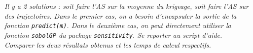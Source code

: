\documentclass[12pt]{scrartcl}
\begin{document}
\textit{Il y a 2 solutions : soit faire l'AS sur la moyenne du krigeage, soit faire l'AS sur des trajectoires.
Dans le premier cas, on a besoin d'encapsuler la sortie de la fonction \texttt{predict(m)}. Dans le deuxième cas, on peut directement utiliser la fonction \texttt{sobolGP} du package \texttt{sensitivity}.
Se reporter au script d'aide. Comparer les deux résultats obtenus et les temps de calcul respectifs.} 

\end{document}
